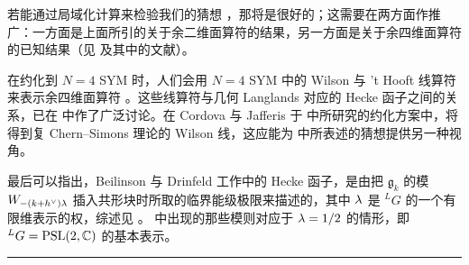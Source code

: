 若能通过局域化计算来检验我们的猜想 ，那将是很好的；这需要在两方面作推广：一方面是上面所引的关于余二维面算符的结果，另一方面是关于余四维面算符的已知结果（见 \cite{GLPP} 及其中的文献）。

在约化到 $N=4$ SYM 时，人们会用 $N=4$ SYM 中的 Wilson 与 't Hooft 线算符来表示余四维面算符 \cite{Wi12}。这些线算符与几何 Langlands 对应的 Hecke 函子之间的关系，已在 \cite{KW} 中作了广泛讨论。在 Cordova 与 Jafferis 于 \cite{CJ} 中所研究的约化方案中，将得到复 Chern--Simons 理论的 Wilson 线，这应能为  中所表述的猜想提供另一种视角。

最后可以指出，Beilinson 与 Drinfeld 工作中的 Hecke 函子，是由把 $\mathfrak{g}_k$ 的模 $W_{-(k+h^{\vee})\lambda}$ 插入共形块时所取的临界能级极限来描述的，其中 $\lambda$ 是 ${}^LG$ 的一个有限维表示的权，综述见 \cite[Section 20.5]{FBZ}。 中出现的那些模则对应于 $\lambda=1/2$ 的情形，即 ${}^LG=\mathrm{PSL}(2,\mathbb{C})$ 的基本表示。

\bigskip
\noindent\rule{\textwidth}{0.6pt}


